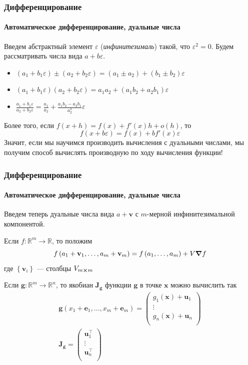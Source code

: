 \documentclass[notheorems,aspectratio=169]{beamer}
\begin{document}
\begin{frame}
  \frametitle{Дифференцирование}
  \framesubtitle{Автоматическое дифференцирование, дуальные числа}

  Введем абстрактный элемент $\varepsilon$ (\emph{инфинитезималь}) такой, что $\varepsilon^2=0$. Будем рассматривать числа вида $a+b\varepsilon$. 
  \begin{itemize}
    \item $\left(a_1+b_1\varepsilon\right)\pm\left(a_2+b_2\varepsilon\right)=\left(a_1\pm a_2\right)+\left(b_1\pm b_2\right)\varepsilon$
    \item $\left(a_1+b_1\varepsilon\right)\left(a_2+b_2\varepsilon\right)=a_1a_2+\left(a_1b_2+a_2b_1\right)\varepsilon$
    \item $\frac{a_1+b_1\varepsilon}{a_2+b_2\varepsilon}=\frac{a_1}{a_2}+\frac{a_1b_2-a_2b_1}{a_2^2}\varepsilon$
  \end{itemize}
  Более того, если $f\left(x+h\right)=f\left(x\right)+f'\left(x\right)h+o(h)$, то
  $$f\left(x+b\varepsilon\right)=f\left(x\right)+bf'\left(x\right)\varepsilon$$
  Значит, если мы научимся производить вычисления с дуальными числами, мы получим способ вычислять производную по ходу вычисления функции!
\end{frame}

\begin{frame}
  \frametitle{Дифференцирование}
  \framesubtitle{Автоматическое дифференцирование, дуальные числа}
  Введем теперь дуальные числа вида $a+\mathbf{v}$ с $m$-мерной инфинитезимальной компонентой.

  Если $f: \mathbb{R}^m\to\mathbb{R}$, то положим 
  $$f\left(a_1+\mathbf{v}_1,\dotsc,a_m+\mathbf{v}_m\right)=f\left(a_1,\dotsc,a_m\right)+V\grad f$$
  где $\left\{\mathbf{v}_i\right\}$ --- столбцы $V_{m\cross m}$

  Если $\mathbf{g}:\mathbb{R}^m\to\mathbb{R}^n$, то якобиан $\mathbf{J_g}$ функции $\mathbf{g}$ в точке $\mathbf{x}$ можно вычислить так 
  \begin{equation*}
    \begin{gathered}
      \mathbf{g}\left(x_1+\mathbf{e}_1,\dotsc,x_m+\mathbf{e}_m\right)=
      \begin{pmatrix}
        g_1\left(\mathbf{x}\right)+\mathbf{u}_1 \\
        \vdots \\
        g_n\left(\mathbf{x}\right)+\mathbf{u}_n \\
      \end{pmatrix} \\
      \mathbf{J_g}=
      \begin{pmatrix}
        \mathbf{u}_1^\intercal \\
        \vdots \\
        \mathbf{u}_n^\intercal \\
      \end{pmatrix}
    \end{gathered}
  \end{equation*}

\end{frame}
\end{document}
